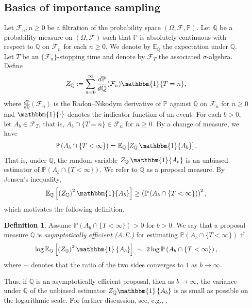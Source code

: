 \documentclass[aap,preprint]{imsart}
\newcommand{\Qro}{\mathbb{Q}}
\newcommand{\Pro}{{\mathbb{P}}}
\newcommand{\Exp}{{\mathbb{E}}}
\newcommand{\bN}{\mathbb{N}}
\newcommand{\cF}{\mathcal{F}}
\theoremstyle{plain}
\theoremstyle{definition}
\newtheorem{definition}{Definition}[section]
\begin{document}
\subsection{Basics of importance sampling} 
Let $\cF_n, n \geq 0$ be a filtration of the probability space  $(\Omega,\mathcal{F},\Pro)$. 
Let $\Qro$ be a probability measure on $(\Omega, \cF)$ such that $\Pro$ is absolutely continuous with respect to $\Qro$ on $\cF_n$ for each $n \geq 0$. We denote by $\Exp_{\Qro}$ the expectation under $\Qro$. Let $T$ be an $\{\cF_n\}$-stopping time and denote by $\cF_T$ the associated $\sigma$-algebra. Define
$$
 {Z}_{\Qro}:= \sum_{n=0}^{\infty} \frac{d\Pro}{d\Qro}(\cF_n) \mathbbm{1}\{T = n\},
$$
where $\frac{d\Pro}{d\Qro}(\cF_n)$ is the Radon–Nikodym derivative of $\Pro$ against $\Qro$ on $\cF_n$ for $n \geq 0$ and $\mathbbm{1}\{\cdot\}$ denotes the indicator function of an event. For each $b > 0$, let $A_b \in \cF_T$, that is, $A_b \cap \{T = n\} \in \cF_n$ for $n \geq 0$. By a change of measure, we have
\begin{align*}
    \Pro\left(A_b \cap \{T < \infty \}\right) = \Exp_{\Qro}\left[ {Z}_{\Qro} \,  \mathbbm{1}\{A_b \} \right].
\end{align*}
That is, under $\Qro$, the random variable ${Z}_{\Qro} \, \mathbbm{1}\{A_b\}$ is an unbiased estimator of $\Pro\left(A_b \cap \{T < \infty\}\right)$. We refer to $\Qro$ as a proposal measure. By Jensen's inequality, 
\begin{align*}
    \Exp_{\Qro}\left[ \left({Z}_{\Qro}\right)^2 \mathbbm{1}\{A_b\} \right] \geq \left(\Pro\left(A_b \cap \{T < \infty \}\right)\right)^2,
\end{align*}
which motivates the following definition.

\begin{definition} \label{def:AE}
Assume $\Pro\left(A_b \cap \{T < \infty \}\right) > 0$ for $b > 0$.
We say that a proposal measure $\mathbb{Q}$ is \emph{asymptotically efficient (A.E.)} for estimating $\Pro(A_b \cap \{T < \infty\})$ if
\begin{align*}
    \log \Exp_{\mathbb{Q}}\left[\left({Z}_{\Qro} \right)^2  \mathbbm{1}\left\{A_b\right\}\right] \;\sim\; 2 \log \Pro\left(A_b \cap \{T < \infty\}\right),
\end{align*}
where $\sim$ denotes that the ratio of the two sides converges to $1$ as $b \to \infty$.
\end{definition}
Thus, if $\mathbb{Q}$ is an asymptotically efficient proposal, then as $b \to \infty$, the variance under $\mathbb{Q}$ of the unbiased estimator
${Z}_{\Qro}  \mathbbm{1}\left\{A_b\right\}$  is as small as possible on the logarithmic scale. For further discussion, see, e.g., \cite{asmussen2007stochastic, glasserman1997}.
\end{document}
